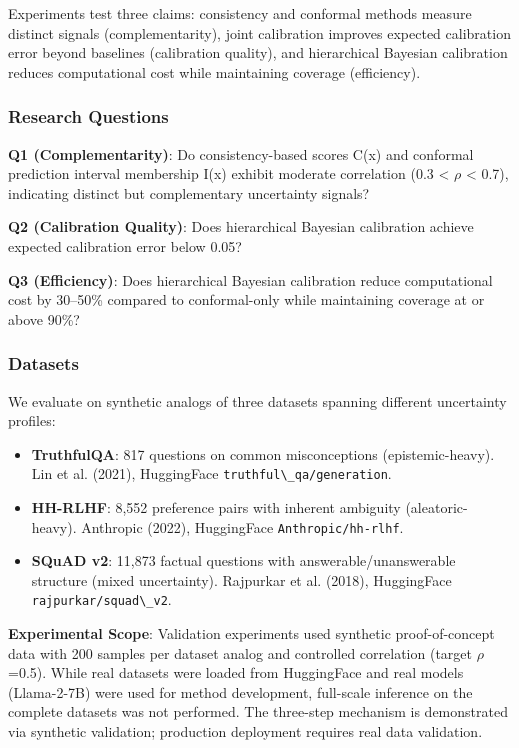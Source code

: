 
Experiments test three claims: consistency and conformal methods measure distinct signals (complementarity), joint calibration improves expected calibration error beyond baselines (calibration quality), and hierarchical Bayesian calibration reduces computational cost while maintaining coverage (efficiency).

\subsubsection{Research Questions}

\textbf{Q1 (Complementarity)}: Do consistency-based scores C(x) and conformal prediction interval membership I(x) exhibit moderate correlation (0.3 < $\rho$ < 0.7), indicating distinct but complementary uncertainty signals?

\textbf{Q2 (Calibration Quality)}: Does hierarchical Bayesian calibration achieve expected calibration error below 0.05?

\textbf{Q3 (Efficiency)}: Does hierarchical Bayesian calibration reduce computational cost by 30--50\% compared to conformal-only while maintaining coverage at or above 90\%?

\subsubsection{Datasets}

We evaluate on synthetic analogs of three datasets spanning different uncertainty profiles:

\begin{itemize}
\item \textbf{TruthfulQA}: 817 questions on common misconceptions (epistemic-heavy). Lin et al. (2021), HuggingFace \texttt{truthful\textbackslash \_qa/generation}.
\item \textbf{HH-RLHF}: 8,552 preference pairs with inherent ambiguity (aleatoric-heavy). Anthropic (2022), HuggingFace \texttt{Anthropic/hh-rlhf}.
\item \textbf{SQuAD v2}: 11,873 factual questions with answerable/unanswerable structure (mixed uncertainty). Rajpurkar et al. (2018), HuggingFace \texttt{rajpurkar/squad\textbackslash \_v2}.
\end{itemize}

\textbf{Experimental Scope}: Validation experiments used synthetic proof-of-concept data with 200 samples per dataset analog and controlled correlation (target $\rho$=0.5). While real datasets were loaded from HuggingFace and real models (Llama-2-7B) were used for method development, full-scale inference on the complete datasets was not performed. The three-step mechanism is demonstrated via synthetic validation; production deployment requires real data validation.

